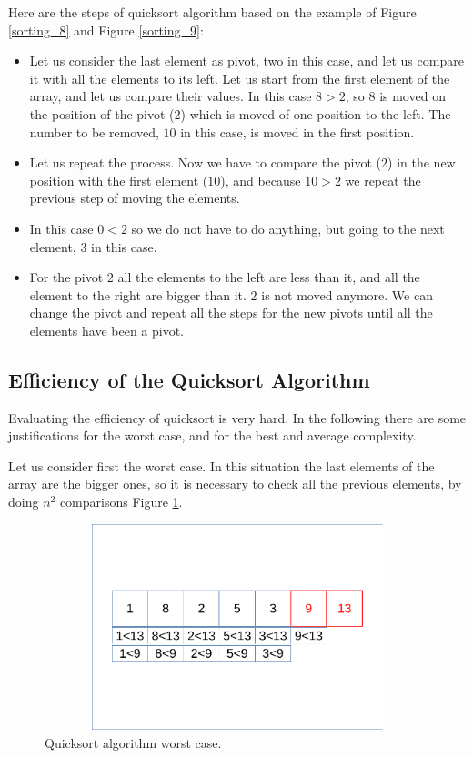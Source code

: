 Here are the steps of quicksort algorithm based on the example of Figure \ref{sorting_8} and Figure \ref{sorting_9}:
\begin{itemize}
\item[1] Let us consider the last element as pivot, two in this case, and let us compare it with all the elements to its left. Let us start from the first element of the array, and let us compare their values. In this case \(8 > 2\), so \(8\) is moved on the position of the pivot (\(2\)) which is moved of one position to the left. The number to be removed, \(10\) in this case, is moved in the first position.
\item[2] Let us repeat the process. Now we have to compare the pivot (\(2\)) in the new position with the first element (\(10\)), and because \(10>2\) we repeat the previous step of moving the elements.
\item[3] In this case \(0<2\) so we do not have to do anything, but going to the next element, \(3\) in this case.
\item[4] For the pivot \(2\) all the elements to the left are less than it, and all the element to the right are bigger than it. \(2\) is not moved anymore. We can change the pivot and repeat all the steps for the new pivots until all the elements have been a pivot.
\end{itemize}

\subsection{Efficiency of the Quicksort Algorithm}
Evaluating the efficiency of quicksort is very hard. In the following there are some justifications for the worst case, and for the best and average complexity.

Let us consider first the worst case. In this situation the last elements of the array are the bigger ones, so it is necessary to check all the previous elements, by doing \(n^{2}\) comparisons Figure \ref{sorting_10}.

\begin{figure}[hb]
	\includegraphics[width=14cm,height=6cm]{chapters/searchandsorting/images/sorting_10.pdf}
	\caption[]{Quicksort algorithm worst case.}
	\label{sorting_10}
\end{figure}

